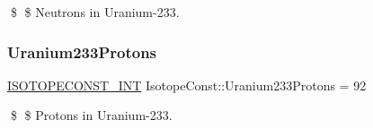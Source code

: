 \$ \$ Neutrons in Uranium-\/233. \mbox{\label{group___isotope_const-_uranium-_u233_gaa185ba1c1f059cecc3d70560e413cd6b}} 
\subsubsection{\texorpdfstring{Uranium233\+Protons}{Uranium233Protons}}
{\footnotesize\ttfamily \mbox{\hyperlink{group___isotope_const-_macros_ga5f18360b3e99483a35c32d789e62621c}{I\+S\+O\+T\+O\+P\+E\+C\+O\+N\+S\+T\+\_\+\+I\+NT}} Isotope\+Const\+::\+Uranium233\+Protons = 92}

\$ \$ Protons in Uranium-\/233. 